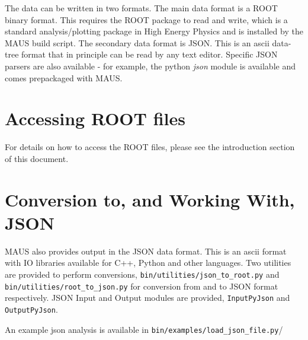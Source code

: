 The data can be written in two formats. The main data format is a ROOT binary format. This requires the ROOT package to read and write, which is a standard analysis/plotting package in High Energy Physics and is installed by the MAUS build script. The secondary data format is JSON. This is an ascii data-tree format that in principle can be read by any text editor. Specific JSON parsers are also available - for example, the python \emph{json} module is available and comes prepackaged with MAUS.

\section{Accessing ROOT files}
For details on how to access the ROOT files, please see the introduction section of this document.

\section{Conversion to, and Working With, JSON}
MAUS also provides output in the JSON data format. This is an ascii format with IO libraries available for C++, Python and other languages. Two utilities are provided to perform conversions, \verb|bin/utilities/json_to_root.py| and \verb|bin/utilities/root_to_json.py| for conversion from and to JSON format respectively. JSON Input and Output modules are provided, \verb|InputPyJson| and \verb|OutputPyJson|.

An example json analysis is available in \verb|bin/examples/load_json_file.py|/

